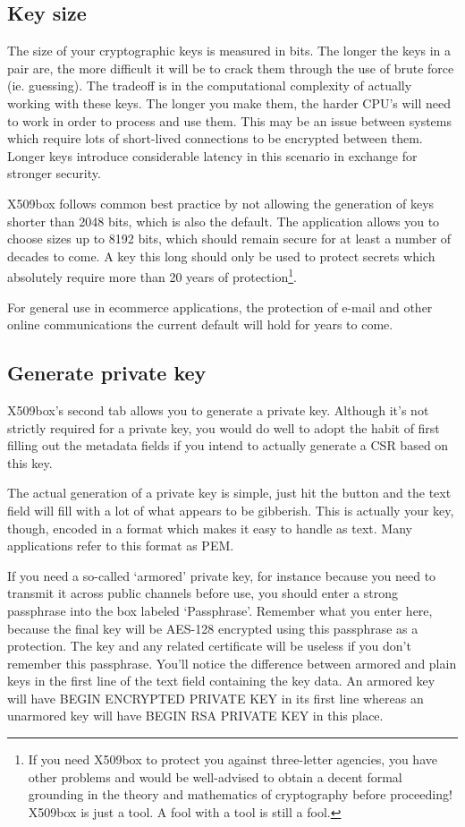 \documentclass[a4paper,12pt]{article}
\begin{document}
\subsection{Key size}
The size of your cryptographic keys is measured in bits. The longer the keys in a pair are, the more difficult it will be to crack them through the use of brute force (ie. guessing). The tradeoff is in the computational complexity of actually working with these keys. The longer you make them, the harder CPU's will need to work in order to process and use them. This may be an issue between systems which require lots of short-lived connections to be encrypted between them. Longer keys introduce considerable latency in this scenario in exchange for stronger security.

X509box follows common best practice by not allowing the generation of keys shorter than 2048 bits, which is also the default. The application allows you to choose sizes up to 8192 bits, which should remain secure for at least a number of decades to come. A key this long should only be used to protect secrets which absolutely require more than 20 years of protection\footnote{If you need X509box to protect you against three-letter agencies, you have other problems and would be well-advised to obtain a decent formal grounding in the theory and mathematics of cryptography before proceeding! X509box is just a tool. A fool with a tool is still a fool.}.

For general use in ecommerce applications, the protection of e-mail and other online communications the current default will hold for years to come.

\subsection{Generate private key}
X509box's second tab allows you to generate a private key. Although it's not strictly required for a private key, you would do well to adopt the habit of first filling out the metadata fields if you intend to actually generate a CSR based on this key.

The actual generation of a private key is simple, just hit the button and the text field will fill with a lot of what appears to be gibberish. This is actually your key, though, encoded in a format which makes it easy to handle as text. Many applications refer to this format as PEM.

If you need a so-called `armored' private key, for instance because you need to transmit it across public channels before use, you should enter a strong passphrase into the box labeled `Passphrase'. Remember what you enter here, because the final key will be AES-128 encrypted using this passphrase as a protection. The key and any related certificate will be useless if you don't remember this passphrase. You'll notice the difference between armored and plain keys in the first line of the text field containing the key data. An armored key will have BEGIN ENCRYPTED PRIVATE KEY in its first line whereas an unarmored key will have BEGIN RSA PRIVATE KEY in this place.
\end{document}

